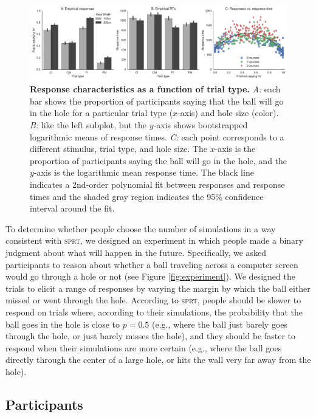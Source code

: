 \documentclass[10pt,letterpaper]{article}
\begin{document}
\begin{figure}[t]
    \begin{center}
        \includegraphics[width=\textwidth]{figures/hole_empirical_results.pdf}
        \caption{\textbf{Response characteristics as a function of trial type.}
        \emph{A:} each bar shows the proportion of participants saying that the ball will go in the hole for a particular trial type ($x$-axis) and hole size (color).
        \emph{B:} like the left subplot, but the $y$-axis shows bootstrapped logarithmic means of response times. 
        \emph{C:} each point corresponds to a different stimulus, trial type, and hole size.  
        The $x$-axis is the proportion of participants saying the ball will go in the hole, and the $y$-axis is the logarithmic mean response time. 
        The black line indicates a 2nd-order polynomial fit between responses and response times and the shaded gray region indicates the 95\% confidence interval around the fit.}
        \label{fig:pct-vs-rt}
    \end{center}
\end{figure}

To determine whether people choose the number of simulations in a way consistent with \textsc{sprt}, we designed an experiment in which people made a binary judgment about what will happen in the future.
Specifically, we asked participants to reason about whether a ball traveling across a computer screen would go through a hole or not (see Figure \ref{fig:experiment}).
We designed the trials to elicit a range of responses by varying the margin by which the ball either missed or went through the hole.
According to \textsc{sprt}, people should be slower to respond on trials where, according to their simulations, the probability that the ball goes in the hole is close to $p=0.5$ (e.g., where the ball just barely goes through the hole, or just barely misses the hole), and they should be faster to respond when their simulations are more certain (e.g., where the ball goes directly through the center of a large hole, or hits the wall very far away from the hole).

\subsection{Participants}
\end{document}
